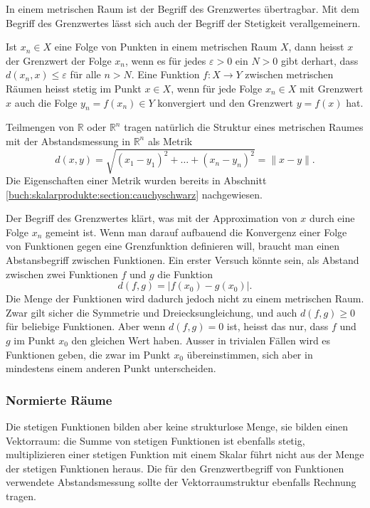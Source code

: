 In einem metrischen Raum ist der Begriff des Grenzwertes übertragbar.
Mit dem Begriff des Grenzwertes lässt sich auch der Begriff der
Stetigkeit verallgemeinern.

\begin{definition}
Ist $x_n\in X$ eine Folge von Punkten in einem metrischen Raum $X$,
dann heisst $x$ der Grenzwert der Folge $x_n$, wenn es für jedes
$\varepsilon>0$ ein $N>0$ gibt derhart, dass
$d(x_n,x)\le \varepsilon$ für alle $n>N$.
Eine Funktion $f\colon X\to Y$ zwischen metrischen Räumen heisst
stetig im Punkt $x\in X$, wenn für jede Folge $x_n\in X$ mit
Grenzwert $x$ auch die Folge $y_n=f(x_n)\in Y$ konvergiert und
den Grenzwert $y=f(x)$ hat.
\end{definition}

Teilmengen von $\mathbb{R}$ oder $\mathbb{R}^n$ tragen natürlich
die Struktur eines metrischen Raumes mit der Abstandsmessung in 
$\mathbb{R}^n$ als Metrik
\[
d(x,y) = \!\sqrt{(x_1-y_1)^2 + \ldots + (x_n-y_n)^2} = \|x-y\|.
\]
Die Eigenschaften einer Metrik wurden bereits in Abschnitt
\ref{buch:skalarprodukte:section:cauchyschwarz} nachgewiesen.

Der Begriff des Grenzwertes klärt, was mit der Approximation von $x$
durch eine Folge $x_n$ gemeint ist.
Wenn man darauf aufbauend die Konvergenz einer Folge von Funktionen
gegen eine Grenzfunktion definieren will, braucht man einen Abstansbegriff
zwischen Funktionen.
Ein erster Versuch könnte sein, als Abstand zwischen zwei Funktionen
$f$ und $g$ die Funktion
\[
d(f,g) = |f(x_0) - g(x_0)|.
\]
Die Menge der Funktionen wird dadurch jedoch nicht zu einem metrischen
Raum.
Zwar gilt sicher die Symmetrie und Dreiecksungleichung, und auch 
$d(f,g)\ge 0$ für beliebige Funktionen.
Aber wenn $d(f,g)=0$ ist, heisst das nur, dass $f$ und $g$ im Punkt
$x_0$ den gleichen Wert haben.
Ausser in trivialen Fällen wird es Funktionen geben, die zwar im Punkt
$x_0$ übereinstimmen, sich aber in mindestens einem anderen Punkt
unterscheiden.

%
%
\subsubsection{Normierte Räume}
Die stetigen Funktionen bilden aber keine strukturlose Menge, sie
bilden einen Vektorraum: die Summe von stetigen Funktionen ist ebenfalls
stetig, multiplizieren einer stetigen Funktion mit einem Skalar führt
nicht aus der Menge der stetigen Funktionen heraus.
Die für den Grenzwertbegriff von Funktionen verwendete Abstandsmessung 
sollte der Vektorraumstruktur ebenfalls Rechnung tragen.

